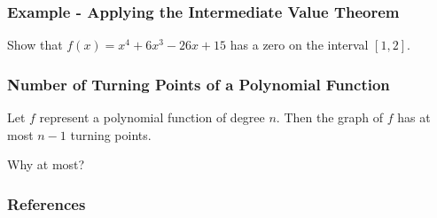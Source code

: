 \documentclass{beamer}
\begin{document}
\begin{frame}
    \frametitle{Example - Applying the Intermediate Value Theorem}

    Show that \(f(x)= x^4 + 6x^3 - 26 x + 15\) has a zero on the interval \([1,2]\). 

\end{frame}

\begin{frame}
    \frametitle{Number of Turning Points of a Polynomial Function}

    Let \(f\) represent a polynomial function of degree \(n\). Then the graph of \(f\) has at most \(n-1\) turning points. \\\pause 

    \vspace{1cm}

    Why at most? 

    

\end{frame}



\begin{frame}
    \frametitle{References}
\end{frame}
\end{document}
